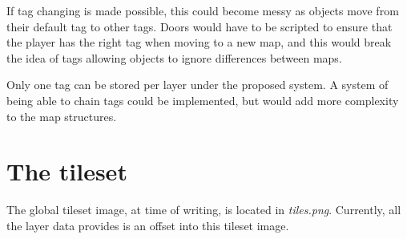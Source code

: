 \documentclass [12pt,a4paper]{article}
\begin{document}
If tag changing is made possible, this could become messy as objects
move from their default tag to other tags.  Doors would have to be
scripted to ensure that the player has the right tag when moving to a
new map, and this would break the idea of tags allowing objects to
ignore differences between maps.

Only one tag can be stored per layer under the proposed system.  A
system of being able to chain tags could be implemented, but would add
more complexity to the map structures.

\section {The tileset}

The global tileset image, at time of writing, is located in
\emph{tiles.png}.  Currently, all the layer data provides is an offset
into this tileset image.
\end{document}
